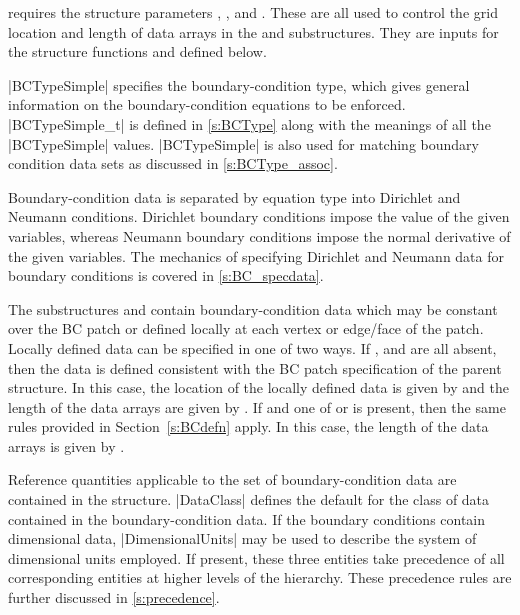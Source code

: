  requires the structure parameters ,
,  and
.  These are all used to control the grid location
and length of data arrays in the  and 
substructures.  They are inputs for the structure functions 
and  defined below.

|BCTypeSimple| specifies the boundary-condition type, which gives general
information on the bound\-ary-con\-di\-tion equations to be enforced.
|BCTypeSimple_t| is defined in \autoref{s:BCType} along with the meanings
of all the |BCTypeSimple| values.  
|BCTypeSimple| is also used for matching boundary condition data sets as 
discussed in \autoref{s:BCType_assoc}.

Boundary-condition data is separated by equation type into Dirichlet
and Neumann conditions.  Dirichlet boundary conditions impose the
value of the given variables, whereas Neumann boundary conditions
impose the normal derivative of the given variables.  The mechanics of
specifying Dirichlet and Neumann data for boundary conditions is covered
in \autoref{s:BC_specdata}.

The substructures  and  contain
boundary-condition data which may be constant over the BC patch or
defined locally at each vertex or edge/face of the patch.
Locally defined data can be specified in one of two ways.
If ,  and  are all absent,
then the data is defined consistent with the BC patch specification of the
parent  structure.  In this case, the location of the locally defined
data is given by  and the length of the data arrays
are given by .  If  and one of
 or  is present, then the same rules provided
in Section~\autoref{s:BCdefn} apply.  In this case, the length of the data arrays
is given by .

Reference quantities applicable to the set of boundary-condition data are
contained in the  structure.
|DataClass| defines the default for the class of data contained in the
boundary-condition data.
If the boundary conditions contain dimensional data, |DimensionalUnits|
may be used to describe the system of dimensional units employed.
If present, these three entities take precedence of all corresponding
entities at higher levels of the hierarchy.
These precedence rules are further discussed in \autoref{s:precedence}.

